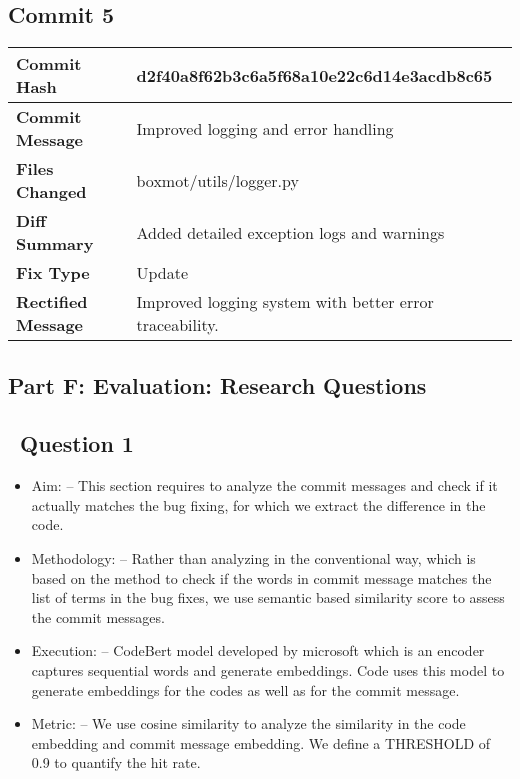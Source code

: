 \documentclass[12pt,a4paper]{article}
\begin{document}
\subsection*{Commit 5}
\begin{tabular}{|p{3cm}|p{10cm}|}
\hline
\textbf{Commit Hash} & d2f40a8f62b3c6a5f68a10e22c6d14e3acdb8c65 \\
\hline
\textbf{Commit Message} & Improved logging and error handling \\
\hline
\textbf{Files Changed} & 
boxmot/utils/logger.py \\
\hline
\textbf{Diff Summary} & Added detailed exception logs and warnings \\
\hline
\textbf{Fix Type} & Update \\
\hline
\textbf{Rectified Message} & Improved logging system with better error traceability. \\
\hline
\end{tabular}

\newpage

\subsection*{Part F: Evaluation: Research Questions}

\subsection*{\   Question 1}

\begin{itemize}
    \item {Aim:} -- This section requires to analyze the commit messages and check if it actually matches the bug fixing, for which we extract the difference in the code.
    \item {Methodology:} -- Rather than analyzing in the conventional way, which is based on the method to check if the words in commit message matches the list of terms in the bug fixes, we use semantic based similarity score to assess the commit messages.
    \item {Execution:} -- CodeBert model developed by microsoft which is an encoder captures sequential words and generate embeddings. Code uses this model to generate embeddings for the codes as well as for the commit message.
    \item {Metric: } -- We use cosine similarity to analyze the similarity in the code embedding and commit message embedding. We define a THRESHOLD of 0.9 to quantify the hit rate. 
\end{itemize}
\end{document}
